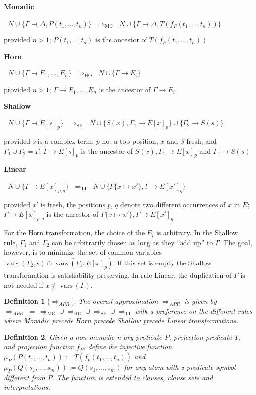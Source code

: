 \documentclass{llncs}
\newcommand{\imp}{\rightarrow}
\newcommand{\Proj}[1]{\mu_{#1}}
\newcommand{\apr}{ \Rightarrow_{APR}}
\newtheorem{defin}{Definition}
\newcommand{\vars}{\operatorname{vars}}
\newcommand{\shortrules}[6]{\noindent\begin{minipage}{#6ex}{\bfseries #1}\end{minipage} $\;$ #2 $\;\Rightarrow_{\text{#5}}\;$ #3 \par\smallskip\noindent #4}
\begin{document}
\bigskip
\shortrules{Monadic}{$N\cup\{\Gamma \imp \Delta,P(t_1,\dots,t_n)\}$}{$N\cup\{\Gamma \imp \Delta,T(f_P(t_1,\dots,t_n))\}$}{provided $n>1$; $P(t_1,\dots,t_n)$ is the ancestor of $T(f_P(t_1,\dots,t_n))$}{MO}{10}

\bigskip
\shortrules{Horn}{$N\cup\{\Gamma \imp E_1, \dots,E_n\}$}{$N\cup\{\Gamma \imp E_i\}$}{provided $n>1$; $\Gamma \imp E_1, \dots,E_n$ is the ancestor of $\Gamma \imp E_i$}{HO}{10}

\bigskip
\shortrules{Shallow}{$N\cup\{\Gamma \imp E[s]_{p}\}$}{$N\cup\{S(x),\Gamma_1 \imp E[x]_{p}\}\cup\{ \Gamma_2 \imp S(s)\}$}{provided $s$ is a complex term, $p$ not a top position, $x$ and $S$ fresh, 
and $\Gamma_1 \cup \Gamma_2 = \Gamma$; $\Gamma \imp E[s]_{p}$ is the ancestor of $S(x),\Gamma_1 \imp E[x]_{p}$ and $\Gamma_2 \imp S(s)$}{SH}{10}

\bigskip
\shortrules{Linear}{$N\cup\{\Gamma \imp E[x]_{p,q}\}$}{$N\cup\{\Gamma\{x \mapsto x'\},\Gamma \imp E[x']_q\}$}{provided $x'$ is fresh, the positions $p$, $q$ denote
two different occurrences of $x$ in $E$; $\Gamma \imp E[x]_{p,q}$ is the ancestor of $\Gamma\{x \mapsto x'\},\Gamma \imp E[x']_q$}{LI}{10}


\bigskip
For the Horn transformation, the choice of the $E_i$ is arbitrary.
In the Shallow rule, $\Gamma_1$ and $\Gamma_2$ can be arbitrarily chosen as long as they ``add up'' to $\Gamma$.
The goal, however, is to minimize the set of common variables 
$\vars(\Gamma_2,s) \cap \vars(\Gamma_1,E[x]_p)$.
If this set is empty the Shallow transformation is satisfiability preserving.
In rule Linear, the duplication of $\Gamma$ is not needed if $x\not\in\vars(\Gamma)$.


\begin{defin}[$\apr$] \label{def:approx:trans}
The overall approximation $\apr$ is given by $\apr\; = \;\Rightarrow_{\text{MO}}\cup\Rightarrow_{\text{HO}}\cup\Rightarrow_{\text{SH}}\cup\Rightarrow_{\text{LI}}$
with a preference on the different rules where  Monadic precede Horn precede Shallow precede Linear transformations.\\
\end{defin}


\begin{defin}
Given a non-monadic n-ary predicate $P$, projection predicate $T$, and projection function $f_P$,
define the injective function $\Proj{P}(P(t_1,\dots,t_n)) := T(f_p(t_1,\dots, t_n))$
and $\Proj{P}(Q(s_1,\dots,s_m)) := Q(s_1,\dots,s_m)$ for any atom with a predicate symbol different from $P$.
The function is extended to clauses, clause sets and interpretations.
\end{defin}
\end{document}
